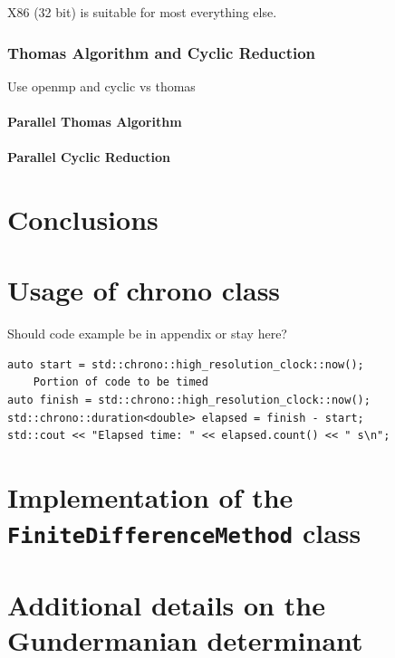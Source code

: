 \documentclass[12pt, oneside]{book}
\theoremstyle{plain}
\theoremstyle{definition}
\begin{document}
X86 (32 bit) is suitable for most everything else.

\subsection{Thomas Algorithm and Cyclic Reduction}
Use openmp and cyclic vs thomas
\subsubsection{Parallel Thomas Algorithm}
\subsubsection{Parallel Cyclic Reduction}


\chapter{Conclusions}


\appendix
\chapter{Usage of chrono class}
Should code example be in appendix or stay here?
\begin{verbatim}
auto start = std::chrono::high_resolution_clock::now();
    Portion of code to be timed
auto finish = std::chrono::high_resolution_clock::now();
std::chrono::duration<double> elapsed = finish - start;
std::cout << "Elapsed time: " << elapsed.count() << " s\n";
\end{verbatim}

\chapter{Implementation of the {\tt FiniteDifferenceMethod} class}
\lipsum[10]
\chapter[shorter running title]{Additional details on the Gundermanian determinant}
\lipsum[10]    



\end{document}
